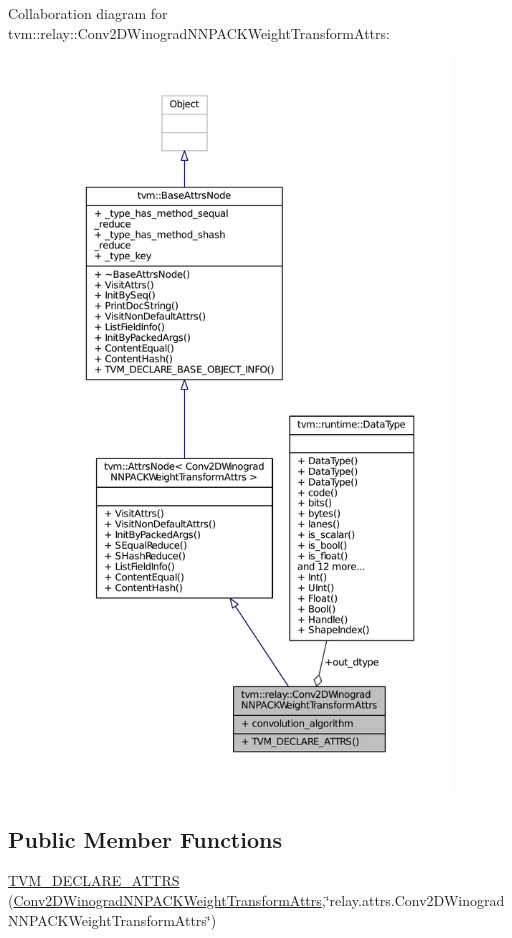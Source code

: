 Collaboration diagram for tvm\+:\+:relay\+:\+:Conv2\+D\+Winograd\+N\+N\+P\+A\+C\+K\+Weight\+Transform\+Attrs\+:
\nopagebreak
\begin{figure}[H]
\begin{center}
\leavevmode
\includegraphics[height=550pt]{structtvm_1_1relay_1_1Conv2DWinogradNNPACKWeightTransformAttrs__coll__graph}
\end{center}
\end{figure}
\subsection*{Public Member Functions}
\begin{DoxyCompactItemize}
\item 
\hyperlink{structtvm_1_1relay_1_1Conv2DWinogradNNPACKWeightTransformAttrs_ae847856a16881151a88665ae280a0b65}{T\+V\+M\+\_\+\+D\+E\+C\+L\+A\+R\+E\+\_\+\+A\+T\+T\+RS} (\hyperlink{structtvm_1_1relay_1_1Conv2DWinogradNNPACKWeightTransformAttrs}{Conv2\+D\+Winograd\+N\+N\+P\+A\+C\+K\+Weight\+Transform\+Attrs},\char`\"{}relay.\+attrs.\+Conv2\+D\+Winograd\+N\+N\+P\+A\+C\+K\+Weight\+Transform\+Attrs\char`\"{})
\end{DoxyCompactItemize}
